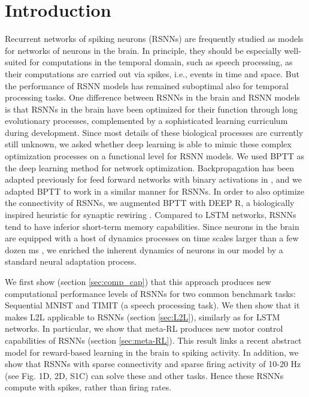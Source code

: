 \documentclass{article} \pdfoutput=1
\begin{document}
\section{Introduction}\label{sec:model}

Recurrent networks of spiking neurons (RSNNs) are frequently studied as
models for networks of neurons in the brain. In principle, they should be
especially well-suited for computations in the temporal domain, such as
speech processing, as their computations are carried out via spikes, i.e.,
events in time and space. 
But the performance of RSNN models has remained suboptimal also for temporal processing tasks.
One difference between RSNNs in the brain and RSNN models is that RSNNs in the brain have been optimized for their function through long evolutionary processes, complemented by a sophisticated learning curriculum during development. Since most details of these biological processes are currently still unknown, we asked whether deep learning is able to mimic these complex optimization processes on a functional level for RSNN models.
We used BPTT as the deep learning method for network optimization. Backpropagation has been adapted previously for feed forward networks with binary activations in \cite{courbariaux_binarized_2016,esser_convolutional_2016}, and we adapted BPTT to work in a similar manner for RSNNs. In order to also optimize the connectivity of RSNNs, we augmented BPTT with DEEP R, a biologically inspired heuristic for synaptic rewiring \cite{kappel2017reward,deepr}.  
Compared to LSTM networks, RSNNs tend to have inferior short-term memory capabilities. Since neurons in the brain are equipped with a host of dynamics processes on time scales larger than a few dozen ms \cite{hasson2015hierarchical}, we enriched the inherent 
dynamics of neurons in our model by a standard neural adaptation process.

We first show (section \ref{sec:comp_cap}) that this approach produces new computational performance levels of RSNNs for two common benchmark tasks: Sequential MNIST and TIMIT (a speech processing task). 
We then show that it makes L2L applicable to RSNNs (section \ref{sec:L2L}), similarly as for LSTM networks. 
In particular, we show that meta-RL \cite{wang2016learning,duan2016rl} produces new motor control capabilities of RSNNs (section \ref{sec:meta-RL}). This result links a recent abstract model for reward-based learning in the brain \cite{WangETAL:18} to spiking activity. In addition, we show that RSNNs with sparse connectivity and sparse firing activity of 10-20 Hz (see Fig. 1D, 2D, S1C) can solve these and other tasks. Hence these RSNNs compute with spikes, rather than firing rates.
\end{document}
